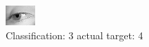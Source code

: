 \begin{figure}[h!]
\begin{center}
\includegraphics[width=0.60\columnwidth]{figures/ID2910_class_3_target_4.png}
\end{center}
\caption{ Classification: 3 actual target: 4}
\label{fig:ID2910_class_3_target_4}
\end{figure}
